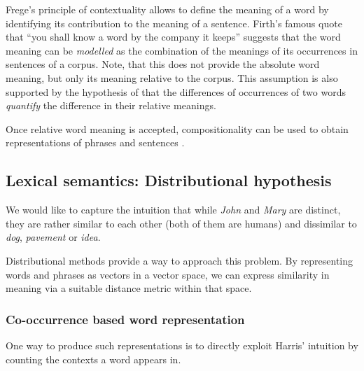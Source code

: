 Frege's principle of contextuality allows to define the meaning of a word by identifying its contribution to the meaning of a sentence. Firth's \citeyearpar{firth1957lingtheory} famous quote that ``you shall know a word by the company it keeps''  suggests that the word meaning can be \emph{modelled} as the combination of the meanings of its occurrences in sentences of a corpus. Note, that this does not provide the absolute word meaning, but only its meaning relative to the corpus. This assumption is also supported by the hypothesis of  that the differences of occurrences of two words \emph{quantify} the difference in their relative meanings.

Once relative word meaning is accepted, compositionality can be used to obtain representations of phrases and sentences \cite{THEO:THEO373,Dowty1980,sep-montague-semantics,DBLP:journals/corr/abs-1003-4394,baroni2014frege}.

\subsection{Lexical semantics: Distributional hypothesis}
\label{sec:distr-hypoth}

We would like to capture the intuition that while \textit{John} and \textit{Mary} are distinct, they are rather similar to each other (both of them are humans) and dissimilar to \textit{dog}, \textit{pavement} or \textit{idea}.


Distributional methods provide a way to approach this problem. By representing words and phrases as vectors in a vector space, we can express similarity in meaning via a suitable distance metric within that space.

\subsubsection{Co-occurrence based word representation}
\label{sec:distr-repr}

One way to produce such representations is to directly exploit Harris' \citeyearpar{harris1954distributional} intuition by counting the contexts a word appears in.


